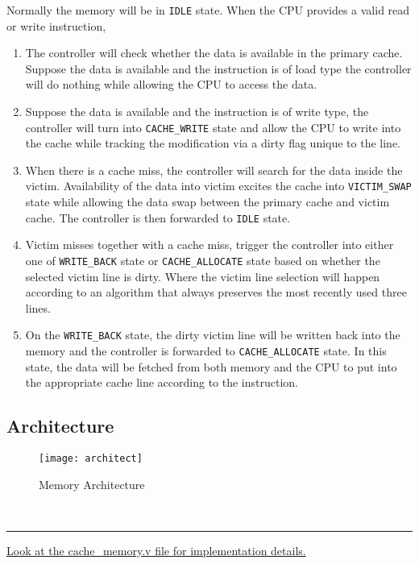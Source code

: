 \documentclass[12pt]{article}
\begin{document}
    Normally the memory will be in \texttt{IDLE} state.
    When the CPU provides a valid read or write instruction,
    \begin{enumerate}
        \item The controller will check whether the data is available in the primary cache.
        Suppose the data is available and the instruction is of load type the controller will do nothing while allowing the CPU to access the data.
        \item Suppose the data is available and the instruction is of write type, the controller will turn into \texttt{CACHE\_WRITE} state and allow the CPU to write into the cache while tracking the modification via a dirty flag unique to the line.
        \item When there is a cache miss, the controller will search for the data inside the victim.
        Availability of the data into victim excites the cache into \texttt{VICTIM\_SWAP} state while allowing the data swap between the primary cache and victim cache.
        The controller is then forwarded to \texttt{IDLE} state.
        \item Victim misses together with a cache miss, trigger the controller into either one of \texttt{WRITE\_BACK} state or \texttt{CACHE\_ALLOCATE} state based on whether the selected victim line is dirty.
        Where the victim line selection will happen according to an algorithm that always preserves the most recently used three lines.
        \item On the \texttt{WRITE\_BACK} state, the dirty victim line will be written back into the memory and the controller is forwarded to \texttt{CACHE\_ALLOCATE} state.
        In this state, the data will be fetched from both memory and the CPU to put into the appropriate cache line according to the instruction.
    \end{enumerate}

    \subsection{Architecture}
    \begin{figure}[h]
        \label{fig:cache_architect}
        \begin{center}
            \texttt{[image: architect]}
        \end{center}
        \caption{Memory Architecture}
    \end{figure}
    \vfill
    \\\hrule
    \href{https://gist.github.com/sanjith1999/ccd039bb128a965e286ad0d640aa9a56}{Look at the cache\_memory.v file for implementation details.}
\end{document}
